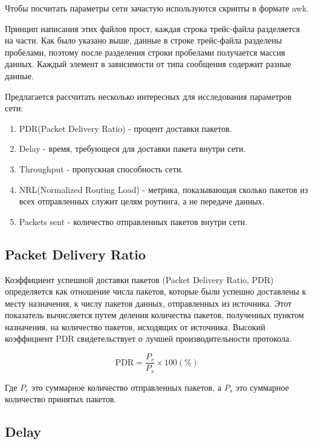 Чтобы посчитать параметры сети зачастую используются скрипты в формате awk. 

Принцип написания этих файлов прост, каждая строка трейс-файла разделяется на части. Как было указано выше, данные в строке трейс-файла разделены пробелами, поэтому после разделения строки пробелами получается массив данных. Каждый элемент в зависимости от типа сообщения содержит разные данные. 

Предлагается рассчитать несколько интересных для исследования параметров сети:

\begin{enumerate}
  \item PDR(Packet Delivery Ratio) - процент доставки пакетов.
  \item Delay - время, требующеся для доставки пакета внутри сети.
  \item Throughput - пропускная способность сети.
  \item NRL(Normalized Routing Load) - метрика, показывающая сколько пакетов из всех отправленных служит целям роутинга, а не передаче данных.
  \item Packets sent - количество отправленных пакетов внутри сети.
\end{enumerate}

\subsection*{Packet Delivery Ratio}

Коэффициент успешной доставки пакетов (Packet Delivery Ratio, PDR) определяется как отношение числа пакетов, которые были успешно доставлены к месту назначения, к числу пакетов данных, отправленных из источника. Этот показатель вычисляется путем деления количества пакетов, полученных пунктом назначения, на количество пакетов, исходящих от источника. Высокий коэффициент PDR свидетельствует о лучшей производительности протокола.

\begin{equation}
  \label{eq:pdr_calculation}
  \text{PDR} = \frac{P_r}{P_s} \times 100(\%)
\end{equation}

Где $P_r$ это суммарное количество отправленных пакетов, а $P_s$ это суммарное количество принятых пакетов.

\subsection*{Delay}

